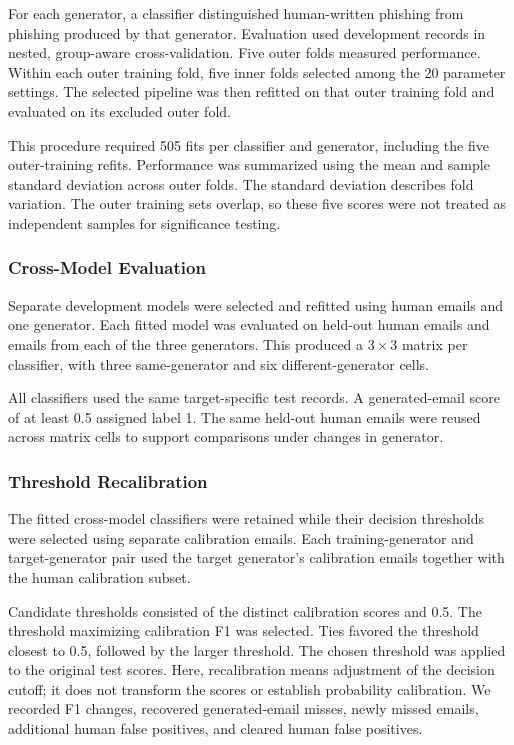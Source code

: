 \documentclass[conference]{IEEEtran}
\begin{document}
For each generator, a classifier distinguished human-written
phishing from phishing produced by that generator. Evaluation
used development records in nested, group-aware cross-validation.
Five outer folds measured performance. Within each outer
training fold, five inner folds selected among the 20 parameter
settings. The selected pipeline was then refitted on that outer
training fold and evaluated on its excluded outer fold.

This procedure required 505 fits per classifier and generator,
including the five outer-training refits. Performance was
summarized using the mean and sample standard deviation across
outer folds. The standard deviation describes fold variation.
The outer training sets overlap, so these five scores were
not treated as independent samples for significance testing.

\subsubsection{Cross-Model Evaluation}

Separate development models were selected and refitted using
human emails and one generator. Each fitted model was evaluated
on held-out human emails and emails from each of the three
generators. This produced a $3 \times 3$ matrix per classifier,
with three same-generator and six different-generator cells.

All classifiers used the same target-specific test records.
A generated-email score of at least 0.5 assigned label 1.
The same held-out human emails were reused across matrix
cells to support comparisons under changes in generator.

\subsubsection{Threshold Recalibration}

The fitted cross-model classifiers were retained while their
decision thresholds were selected using separate calibration
emails. Each training-generator and target-generator pair used
the target generator's calibration emails together with the
human calibration subset.

Candidate thresholds consisted of the distinct calibration
scores and 0.5. The threshold maximizing calibration F1 was
selected. Ties favored the threshold closest to 0.5, followed
by the larger threshold. The chosen threshold was applied to
the original test scores. Here, recalibration means adjustment
of the decision cutoff; it does not transform the scores or
establish probability calibration. We recorded F1 changes,
recovered generated-email misses, newly missed emails,
additional human false positives, and cleared human false positives.
\end{document}
